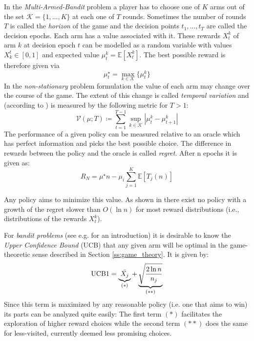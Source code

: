 In the \textit{Multi-Armed-Bandit} problem a player has to choose one of $K$ arms out of the set $\mathcal{K} = \{1,\ldots,K \}$ at each one of $T$ rounds. Sometimes the number of rounds $T$ is called the \textit{horizon} of the game and the decision points $t_1,\ldots,t_T$ are called the decision epochs. Each arm has a value associated with it. These rewards $X^k_t$ of arm $k$ at decision epoch $t$ can be modelled as a random variable with values $X_k^t \in [0,1]$ and expected value $\mu_t^k = \mathbb{E}[X^k_t]$. The best possible reward is therefore given via 
\begin{equation*}
\mu^\star_t = \max_{k \in \mathcal{K}} \{ \mu^k_t\}    
\end{equation*}
In the \textit{non-stationary} problem formulation the value of each arm may change over the course of the game. The extent of this change is called \textit{temporal variation} and (according to \cite{besbes2019optimal}) is measured by the following metric for $T > 1$:
\begin{equation}
    \mathcal{V}(\mu;T) \coloneqq \sum_{t=1}^{T-1} \sup_{k \in \mathcal{K}} \left| \mu_t^k - \mu_{t+1}^k \right|
\end{equation}
The performance of a given policy can be measured relative to an oracle which has perfect information and picks the best possible choice. The difference in rewards between the policy and the oracle is called \textit{regret}. After n epochs it is given as:
\begin{equation}
    R_N = \mu^\star n - \mu_i \sum_{j=1}^K \mathbb{E}[T_j(n)]
\end{equation}

Any policy aims to minimize this value. As shown in \cite{lai1985asymptotically} there exist no policy with a growth of the regret slower than $O(\ln n)$ for most reward distributions (i.e., distributions of the rewards $X^k_t$).


For \textit{bandit problems} (see e.g. \cite{lattimore2018bandit} for an introduction) it is desirable to know the \textit{Upper Confidence Bound} (UCB) that any given arm will be optimal in the game-theoretic sense described in Section \ref{ss:game_theory}. It is given by:
\begin{equation}
    \text{UCB1} = \underbrace{\Bar{X_j}}_{(\ast)} + \underbrace{\sqrt{\frac{2 \ln n}{n_j}}}_{(\ast \ast)}
\end{equation}
Since this term is maximized by any reasonable policy (i.e. one that aims to win) its parts can be analyzed quite easily: The first term $(\ast)$ facilitates the exploration of higher reward choices while the second term $(\ast \ast)$ does the same for less-visited, currently deemed less promising choices.
